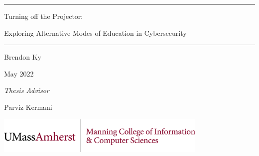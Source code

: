 \begin{titlepage}\begin{center}
    \vspace*{1in}

    \rule{\textwidth}{1pt}
    \Huge Turning off the Projector:

    \Large Exploring Alternative Modes of Education in Cybersecurity
    \rule{\textwidth}{1pt}

    \vspace*{0.5in}

    \huge Brendon Ky
    
    \vspace*{0.25in}

    \Large May 2022

    \vspace*{1in}
    
    \textit{Thesis Advisor}
    
    Parviz Kermani

    \vfill

    \includegraphics[width=4in]{CICS-wide.png}
\end{center}\end{titlepage}